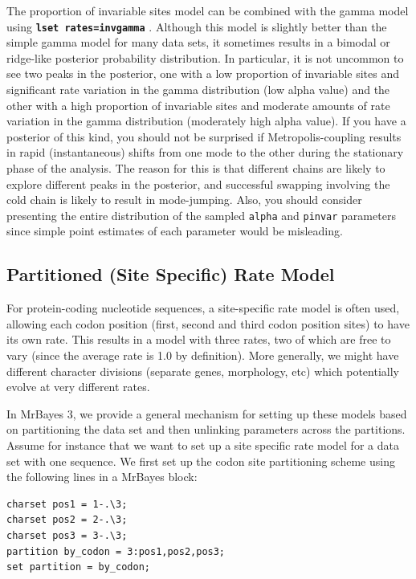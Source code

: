 \documentclass[12pt]{book}
\newcommand{\ttt}[1]{\texttt{#1} }
\newcommand{\tb}[1]{\texttt{\textbf{#1}} }
\begin{document}
The proportion of invariable sites model can be combined with the gamma model using \tb{lset
rates=invgamma}. Although this model is slightly better than the simple gamma model for many data
sets, it sometimes results in a bimodal or ridge-like posterior probability distribution. In
particular, it is not uncommon to see two peaks in the posterior, one with a low proportion of
invariable sites and significant rate variation in the gamma distribution (low alpha value) and the
other with a high proportion of invariable sites and moderate amounts of rate variation in the
gamma distribution (moderately high alpha value). If you have a posterior of this kind, you should
not be surprised if Metropolis-coupling results in rapid (instantaneous) shifts from one mode to
the other during the stationary phase of the analysis. The reason for this is that different chains
are likely to explore different peaks in the posterior, and successful swapping involving the cold
chain is likely to result in mode-jumping. Also, you should consider presenting the entire
distribution of the sampled \ttt{alpha} and \ttt{pinvar} parameters since simple point estimates of
each parameter would be misleading.

\subsection{Partitioned (Site Specific) Rate Model}
For protein-coding nucleotide sequences, a site-specific rate model is often used, allowing each
codon position (first, second and third codon position sites) to have its own rate. This results in
a model with three rates, two of which are free to vary (since the average rate is 1.0 by
definition). More generally, we might have different character divisions (separate genes,
morphology, etc) which potentially evolve at very different rates.

In MrBayes 3, we provide a general mechanism for setting up these models based on partitioning the
data set and then unlinking parameters across the partitions. Assume for instance that we want to
set up a site specific rate model for a data set with one sequence.  We first set up the codon site
partitioning scheme using the following lines in a MrBayes block:

\begin{singlespacing}
\small
\begin{verbatim}
charset pos1 = 1-.\3;
charset pos2 = 2-.\3;
charset pos3 = 3-.\3;
partition by_codon = 3:pos1,pos2,pos3;
set partition = by_codon;
\end{verbatim}
\normalsize
\end{singlespacing}
\end{document}
